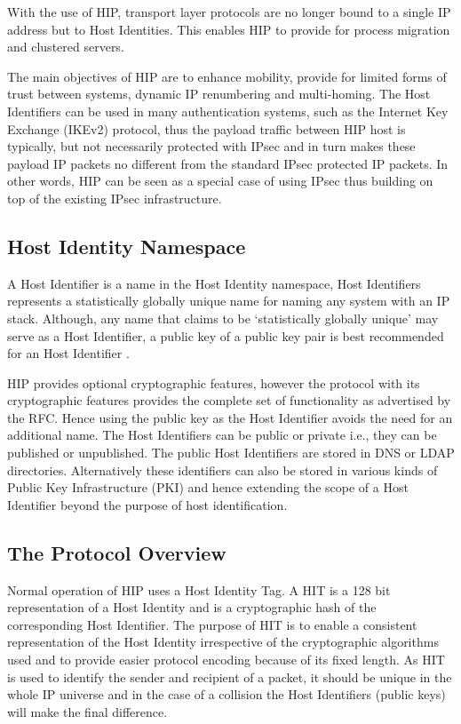With the use of HIP, transport layer protocols are no longer bound to a single IP address but to Host Identities. This enables HIP to provide for process migration and clustered servers.

The main objectives of HIP are to enhance mobility, provide for limited forms of trust between systems, dynamic IP renumbering and multi-homing. The Host Identifiers can be used in many authentication systems, such as the Internet Key Exchange (IKEv2) protocol, thus the payload traffic between HIP host is typically, but not necessarily protected with IPsec and in turn makes these payload IP packets no different from the standard IPsec protected IP packets. In other words, HIP can be seen as a special case of using IPsec thus building on top of the existing IPsec infrastructure.

\subsection{Host Identity Namespace}

A Host Identifier is a name in the Host Identity namespace, Host Identifiers represents a statistically globally unique name for naming any system with an IP stack. Although, any name that claims to be ‘statistically globally unique’ may serve as a Host Identifier, a public key of a public key pair is best recommended for an Host Identifier \cite{HIP_rfc}. 

HIP provides optional cryptographic features, however the protocol with its cryptographic features provides the complete set of functionality as advertised by the RFC. Hence using the public key as the Host Identifier avoids the need for an additional name. The Host Identifiers can be public or private i.e., they can be published or unpublished. The public Host Identifiers are stored in DNS or LDAP directories. Alternatively these identifiers can also be stored in various kinds of Public Key Infrastructure (PKI) and hence extending the scope of a Host Identifier beyond the purpose of host identification.

\subsection{The Protocol Overview}
Normal operation of HIP uses a Host Identity Tag. A HIT is a 128 bit representation of a Host Identity and is a cryptographic hash of the corresponding Host Identifier. The purpose of HIT is to enable a consistent representation of the Host Identity irrespective of the cryptographic algorithms used and to provide easier protocol encoding because of its fixed length. As HIT is used to identify the sender and recipient of a packet, it should be unique in the whole IP universe and in the case of a collision the Host Identifiers (public keys) will make the final difference.

